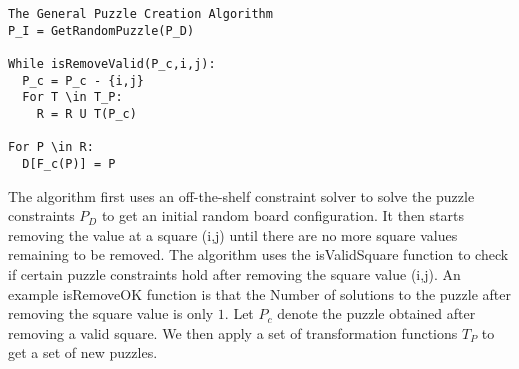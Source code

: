 \documentclass[12pt]{article}
\begin{document}
\begin{verbatim}
The General Puzzle Creation Algorithm
P_I = GetRandomPuzzle(P_D)

While isRemoveValid(P_c,i,j):
  P_c = P_c - {i,j}
  For T \in T_P:
    R = R U T(P_c)

For P \in R:
  D[F_c(P)] = P
\end{verbatim}

The algorithm first uses an off-the-shelf constraint solver to solve
the puzzle constraints $P_D$ to get an initial random board
configuration. It then starts removing the value at a square (i,j)
until there are no more square values remaining to be removed. The
algorithm uses the isValidSquare function to check if certain puzzle
constraints hold after removing the square value (i,j). An example
isRemoveOK function is that the Number of solutions to the puzzle
after removing the square value is only $1$. Let $P_c$ denote the puzzle
obtained after removing a valid square. We then apply a set of
transformation functions $T_P$ to get a set of new puzzles.
\end{document}
